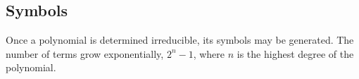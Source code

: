 \subsection{Symbols}

    Once a polynomial is determined irreducible, its symbols may be generated.
    The number of terms grow exponentially, $2^{n}-1$, where $n$ is the highest
    degree of the polynomial.



